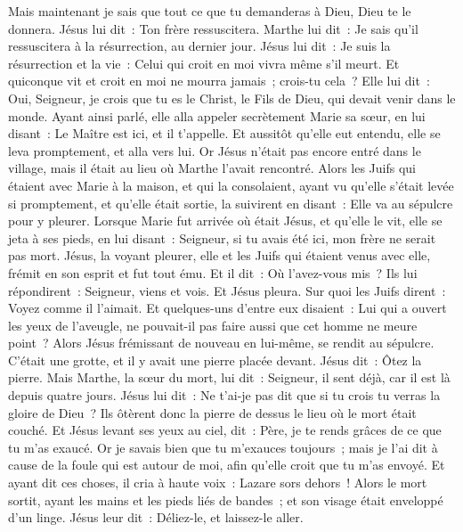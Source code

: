 \begin{multicols}{2}
Mais maintenant je sais que tout ce que tu demanderas à Dieu, Dieu te le donnera.
Jésus lui dit~: Ton frère ressuscitera.
Marthe lui dit~: Je sais qu'il ressuscitera à la résurrection, au dernier jour.
Jésus lui dit~: Je suis la résurrection et la vie~: Celui qui croit en moi vivra même s'il meurt.
Et quiconque vit et croit en moi ne mourra jamais~; crois-tu cela~?
Elle lui dit~: Oui, Seigneur, je crois que tu es le Christ, le Fils de Dieu, qui devait venir dans le monde.
Ayant ainsi parlé, elle alla appeler secrètement Marie sa sœur, en lui disant~: Le Maître est ici, et il t'appelle.
Et aussitôt qu'elle eut entendu, elle se leva promptement, et alla vers lui.
Or Jésus n'était pas encore entré dans le village, mais il était au lieu où Marthe l'avait rencontré.
Alors les Juifs qui étaient avec Marie à la maison, et qui la consolaient, ayant vu qu'elle s'était levée si promptement, et qu'elle était sortie, la suivirent en disant~: Elle va au sépulcre pour y pleurer.
Lorsque Marie fut arrivée où était Jésus, et qu'elle le vit, elle se jeta à ses pieds, en lui disant~: Seigneur, si tu avais été ici, mon frère ne serait pas mort.
Jésus, la voyant pleurer, elle et les Juifs qui étaient venus avec elle, frémit en son esprit et fut tout ému.
Et il dit~: Où l'avez-vous mis~? Ils lui répondirent~: Seigneur, viens et vois.
Et Jésus pleura.
Sur quoi les Juifs dirent~: Voyez comme il l'aimait.
Et quelques-uns d'entre eux disaient~: Lui qui a ouvert les yeux de l'aveugle, ne pouvait-il pas faire aussi que cet homme ne meure point~?
Alors Jésus frémissant de nouveau en lui-même, se rendit au sépulcre. C'était une grotte, et il y avait une pierre placée devant.
Jésus dit~: Ôtez la pierre. Mais Marthe, la sœur du mort, lui dit~: Seigneur, il sent déjà, car il est là depuis quatre jours.
Jésus lui dit~: Ne t'ai-je pas dit que si tu crois tu verras la gloire de Dieu~?
Ils ôtèrent donc la pierre de dessus le lieu où le mort était couché. Et Jésus levant ses yeux au ciel, dit~: Père, je te rends grâces de ce que tu m'as exaucé.
Or je savais bien que tu m'exauces toujours~; mais je l'ai dit à cause de la foule qui est autour de moi, afin qu'elle croit que tu m'as envoyé.
Et ayant dit ces choses, il cria à haute voix~: Lazare sors dehors~!
Alors le mort sortit, ayant les mains et les pieds liés de bandes~; et son visage était enveloppé d'un linge. Jésus leur dit~: Déliez-le, et laissez-le aller.

\end{multicols}
